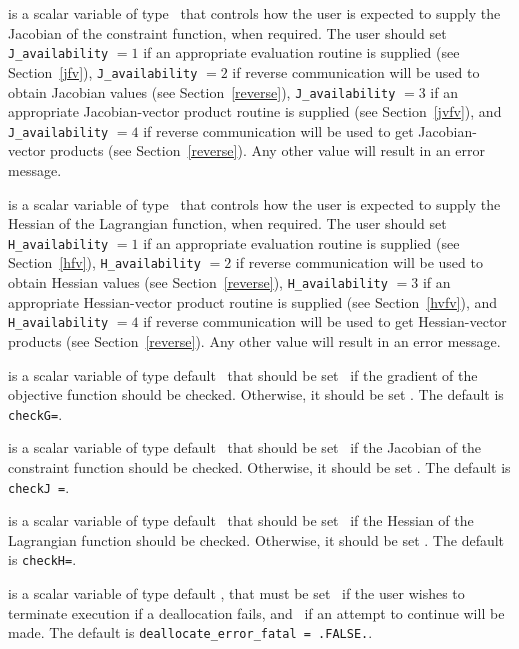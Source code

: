 \documentclass{galahad}
\begin{document}
\begin{description}
 is a scalar variable of type \integer\
that controls how the user is expected to supply the Jacobian of the
constraint function, when required.  The user should set {\tt J\_availability} $=1$
if an appropriate evaluation routine is supplied (see
Section~\ref{jfv}), {\tt J\_availability} $=2$ if reverse
communication will be used to obtain Jacobian values (see
Section~\ref{reverse}), {\tt J\_availability} $=3$ if an appropriate
Jacobian-vector product routine is supplied (see Section~\ref{jvfv}), and
{\tt J\_availability} $=4$ if reverse communication will be used to
get Jacobian-vector products (see Section~\ref{reverse}).   Any other
value will result in an error message.

 is a scalar variable of type \integer\
that controls how the user is expected to supply the Hessian of the
Lagrangian function, when required.  The user should set {\tt H\_availability} $=1$
if an appropriate evaluation routine is supplied (see
Section~\ref{hfv}), {\tt H\_availability} $=2$ if reverse
communication will be used to obtain Hessian values (see
Section~\ref{reverse}), {\tt H\_availability} $=3$ if an appropriate
Hessian-vector product routine is supplied (see Section~\ref{hvfv}), and
{\tt H\_availability} $=4$ if reverse communication will be used to
get Hessian-vector products (see Section~\ref{reverse}).   Any other
value will result in an error message.

 is a scalar variable of type default \logical\ that
should be set \true\ if the gradient of the objective function should be
checked.  Otherwise, it should be set \false.  The default is {\tt checkG=\true}.

\itt{checkJ} is a scalar variable of type default \logical\ that
should be set \true\ if the Jacobian of the constraint function should be
checked.  Otherwise, it should be set \false.  The default is {\tt checkJ =\true}.

\itt{checkH} is a scalar variable of type default \logical\ that
should be set \true\ if the Hessian of the Lagrangian function should be
checked.  Otherwise, it should be set \false.  The default is {\tt checkH=\true}.

\itt{deallocate\_error\_fatal} is a scalar variable of type default \logical, 
that must be set \true\ if the user wishes to terminate execution if
a deallocation  fails, and \false\ if an attempt to continue
will be made. The default is {\tt deallocate\_error\_fatal = .FALSE.}.

\end{description}
\end{document}
